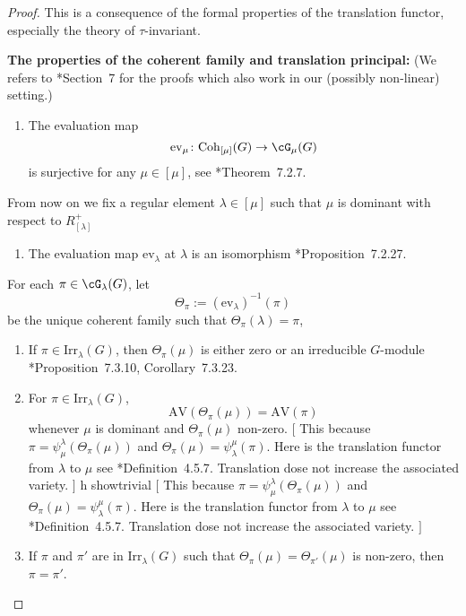 \documentclass[12pt,a4paper]{amsart}
\newcommand{\trivial}[2][]{\if\relax\detokenize{#1}\relax
  {%
      \color{orange} \vspace{0em} $[$  #2 $]$
      \color{black}
  }
  \else
\ifx#1h
\ifcsname showtrivial\endcsname
{%
    \color{orange} \vspace{0em}  $[$ #2 $]$
    \color{black}
}
\fi
\else {\red Wrong argument!} \fi
\fi
}
\newcommand{\AV}{\mathrm{AV}}
\numberwithin{equation}{section}
\theoremstyle{remark}
\def\Irr{\mathrm{Irr}}
\def\Coh{\mathrm{Coh}}
\def\ev#1{{\mathrm{ev}_{#1}}}
\begin{document}
\begin{proof}
  This is a consequence of the formal properties of the translation functor,
  especially the theory of $\tau$-invariant.

  \def\Parm{\mathrm{Parm}} \def\cof{\Theta}


  {\bf The properties of the coherent family and translation principal:} (We
  refers to \cite{Vg}*{Section~7} for the proofs which also work in our
  (possibly non-linear) setting.)

  \begin{enumerate}[label=(\alph*)]
    \item \label{it:t1} The evaluation map
          \[
          \ev{\mu}\colon \Coh_{[\mu]}(G)\rightarrow \Grt_{\mu}(G)
          \]
          is surjective for any $\mu \in [\mu]$, see \cite{Vg}*{Theorem~7.2.7}.
  \end{enumerate}
  From now on we fix a regular element $\lambda \in [\mu]$ such that $\mu$ is
  dominant with respect to $R^{+}_{[\lambda]}$
  \begin{enumerate}[resume*]
    \item \label{it:t2} The evaluation map $\ev{\lambda}$ at $\lambda$ is an
          isomorphism \cite{Vg}*{Proposition~7.2.27}.
  \end{enumerate}
  For each $\pi\in \Grt_{\lambda}(G)$, let
  \[
    \Theta_{\pi}:= (\ev{\lambda})^{-1}(\pi)
  \]
  be the unique coherent family such that $\Theta_{\pi}(\lambda) = \pi$,
  \begin{enumerate}[resume*]
    \item \label{it:t3} If $\pi\in \Irr_{\lambda}(G)$, then $\Theta_{\pi}(\mu)$
          is either zero or an irreducible $G$-module
          \cite{Vg}*{Proposition~7.3.10, Corollary~7.3.23}.
    \item \label{it:t4} For $\pi\in \Irr_{\lambda}(G)$,
          \[
          \AV(\Theta_{\pi}(\mu)) = \AV(\pi)
          \]
          whenever $\mu$ is dominant and $\Theta_{\pi}(\mu)$ non-zero.
          \trivial[]{ This because
          $\pi = \psi_{\mu}^{\lambda}(\Theta_{\pi}(\mu))$ and
          $\Theta_{\pi}(\mu) = \psi_{\lambda}^{\mu}(\pi)$. Here is the
          translation functor from $\lambda$ to $\mu$ see
          \cite{Vg}*{Definition~4.5.7}. Translation dose not increase the
          associated variety. }
    \item \label{it:t5} If $\pi$ and $\pi'$ are in $\Irr_{\lambda}(G)$ such that
          $\Theta_{\pi}(\mu) = \Theta_{\pi'}(\mu)$ is non-zero, then $\pi=\pi'$.
  \end{enumerate}

\end{proof}
\end{document}
